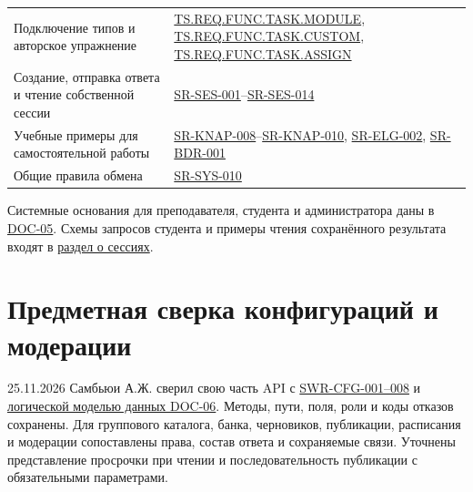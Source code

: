 \documentclass[12pt,a4paper]{article}
\begin{document}
{\begin{longtable}[]{@{}
  >{\raggedright\arraybackslash}p{}
  >{\raggedright\arraybackslash}p{}@{}}
Подключение типов и авторское упражнение & {\href{../02\_Техническое\_задание/Техническое\_задание.pdf\#ts-req-func-task-module}{TS.REQ.FUNC.TASK.MODULE}}, {\href{../02\_Техническое\_задание/Техническое\_задание.pdf\#ts-req-func-task-custom}{TS.REQ.FUNC.TASK.CUSTOM}}, {\href{../02\_Техническое\_задание/Техническое\_задание.pdf\#ts-req-func-task-assign}{TS.REQ.FUNC.TASK.ASSIGN}} \\
Создание, отправка ответа и чтение собственной сессии & {\href{../04\_Системные\_требования/DOC-05\_Системные\_требования.pdf\#sr-ses-001}{SR-SES-001}}--{\href{../04\_Системные\_требования/DOC-05\_Системные\_требования.pdf\#sr-ses-014}{SR-SES-014}} \\
Учебные примеры для самостоятельной работы & {\href{../04\_Системные\_требования/DOC-05\_Системные\_требования.pdf\#sr-knap-008}{SR-KNAP-008}}--{\href{../04\_Системные\_требования/DOC-05\_Системные\_требования.pdf\#sr-knap-010}{SR-KNAP-010}}, {\href{../04\_Системные\_требования/DOC-05\_Системные\_требования.pdf\#sr-elg-002}{SR-ELG-002}}, {\href{../04\_Системные\_требования/DOC-05\_Системные\_требования.pdf\#sr-bdr-001}{SR-BDR-001}} \\
Общие правила обмена & {\href{../04\_Системные\_требования/DOC-05\_Системные\_требования.pdf\#sr-sys-010}{SR-SYS-010}} \\
\end{longtable}
}

Системные основания для преподавателя, студента и администратора даны в {\href{../04\_Системные\_требования/DOC-05\_Системные\_требования.pdf\#doc-05-системные-требования}{DOC-05}}. Схемы запросов студента и примеры чтения сохранённого результата входят в {\hyperlink{doc-08-справочник-api-сессии-задач}{раздел о сессиях}}.

\section{Предметная сверка конфигураций и модерации}\label{ux43fux440ux435ux434ux43cux435ux442ux43dux430ux44f-ux441ux432ux435ux440ux43aux430-ux43aux43eux43dux444ux438ux433ux443ux440ux430ux446ux438ux439-ux438-ux43cux43eux434ux435ux440ux430ux446ux438ux438}

\hypertarget{предметная-сверка-конфигураций-и-модерации}{}

25.11.2026 Самбьюи А.Ж. сверил свою часть API с {\href{../07\_Программные\_требования/DOC-06.6\_Конфигурации\_и\_модерация.pdf\#конфигурации-контрольные-мероприятия-и-модерация}{SWR-CFG-001--008}} и {\href{../07\_Программные\_требования/DOC-06\_Программные\_требования.pdf\#приложение-а-модель-данных}{логической моделью данных DOC-06}}. Методы, пути, поля, роли и коды отказов сохранены. Для группового каталога, банка, черновиков, публикации, расписания и модерации сопоставлены права, состав ответа и сохраняемые связи. Уточнены представление просрочки при чтении и последовательность публикации с обязательными параметрами.
\end{document}

